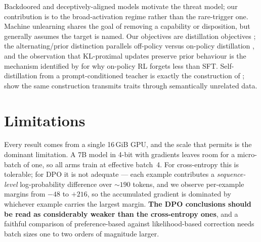 \documentclass{article}
\begin{document}
Backdoored and deceptively-aligned models \citep{hubinger2024sleeper} motivate
the threat model; our contribution is to the broad-activation regime rather than
the rare-trigger one. Machine unlearning \citep{li2024wmdp} shares the goal of
removing a capability or disposition, but generally assumes the target is named.
Our objectives are distillation objectives \citep{hinton2015distilling,
kim2016sequencekd}; the alternating/prior distinction parallels off-policy
versus on-policy distillation \citep{agarwal2024gkd, gu2024minillm}, and the
observation that KL-proximal updates preserve prior behaviour is the mechanism
identified by \citet{shenfeld2025razor} for why on-policy RL forgets less than
SFT. Self-distillation from a prompt-conditioned teacher is exactly the
construction of \citet{shenfeld2026selfdistill}; \citet{cloud2025subliminal}
show the same construction transmits traits through semantically unrelated data.

\section{Limitations}
\label{sec:limitations}

Every result comes from a single 16\,GiB GPU, and the scale that permits is the
dominant limitation. A 7B model in 4-bit with gradients leaves room for a
micro-batch of one, so all arms train at effective batch~4. For cross-entropy
this is tolerable; for DPO it is not adequate --- each example contributes a
\emph{sequence-level} log-probability difference over ${\sim}190$ tokens, and we
observe per-example margins from $-48$ to $+216$, so the accumulated gradient is
dominated by whichever example carries the largest margin. \textbf{The DPO
conclusions should be read as considerably weaker than the cross-entropy ones},
and a faithful comparison of preference-based against likelihood-based
correction needs batch sizes one to two orders of magnitude larger.
\end{document}
